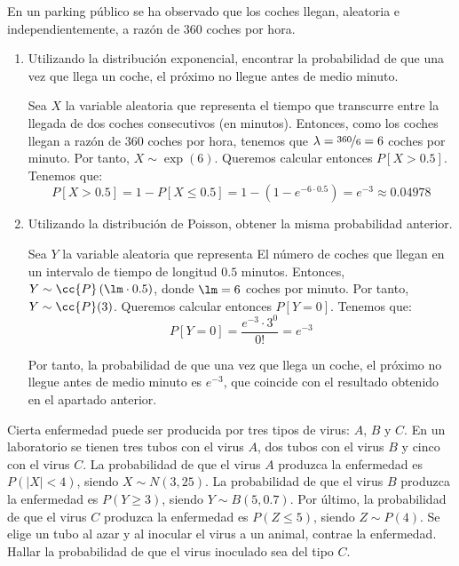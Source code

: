 \begin{ejercicio}
    En un parking público se ha observado que los coches llegan, aleatoria e independientemente, a razón de $360$ coches por hora.
    \begin{enumerate}
        \item Utilizando la distribución exponencial, encontrar la probabilidad de que una vez que llega un coche, el próximo no llegue antes de medio minuto.
        
        Sea $X$ la variable aleatoria que representa el tiempo que transcurre entre la llegada de dos coches consecutivos (en minutos). Entonces, como los coches llegan a razón de $360$ coches por hora, tenemos que $\lambda = \nicefrac{360}{6} = 6$ coches por minuto. Por tanto, $X\sim \exp(6)$.
        Queremos calcular entonces $P[X>0.5]$. Tenemos que:
        \begin{equation*}
            P[X>0.5] = 1-P[X\leq 0.5] = 1-(1-e^{-6\cdot 0.5}) = e^{-3} \approx 0.04978
        \end{equation*}

        \item Utilizando la distribución de Poisson, obtener la misma probabilidad anterior.
        
        Sea $Y$ la variable aleatoria que representa El número de coches que llegan en un intervalo de tiempo de longitud $0.5$ minutos. Entonces, $Y\sim \cc{P}\left(\lm\cdot 0.5\right)$, donde $\lm = 6$ coches por minuto. Por tanto, $Y\sim \cc{P}(3)$.
        Queremos calcular entonces $P[Y=0]$. Tenemos que:
        \begin{equation*}
            P[Y=0] = \dfrac{e^{-3}\cdot 3^0}{0!} = e^{-3}
        \end{equation*}

        Por tanto, la probabilidad de que una vez que llega un coche, el próximo no llegue antes de medio minuto es $e^{-3}$, que coincide con el resultado obtenido en el apartado anterior.
    \end{enumerate}
\end{ejercicio}

\begin{ejercicio}
    Cierta enfermedad puede ser producida por tres tipos de virus: $A$, $B$ y $C$. En un laboratorio se tienen tres tubos con el virus $A$, dos tubos con el virus $B$ y cinco con el virus $C$. La probabilidad de que el virus $A$ produzca la enfermedad es $P(|X| < 4)$, siendo $X \sim N(3,25)$. La probabilidad de que el virus $B$ produzca la enfermedad es $P(Y \geq 3)$, siendo $Y \sim B(5,0.7)$. Por último, la probabilidad de que el virus $C$ produzca la enfermedad es $P(Z \leq 5)$, siendo $Z \sim P(4)$. Se elige un tubo al azar y al inocular el virus a un animal, contrae la enfermedad. Hallar la probabilidad de que el virus inoculado sea del tipo $C$.
\end{ejercicio}

